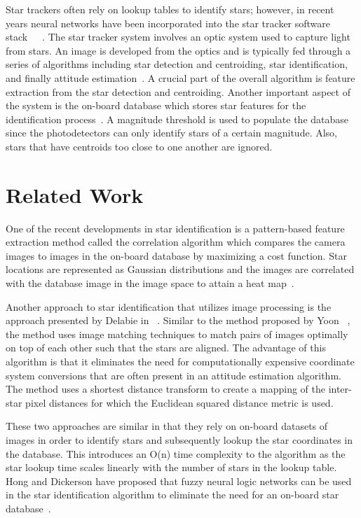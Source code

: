 \documentclass[10pt,twocolumn,letterpaper]{article}
\begin{document}
Star trackers often rely on lookup tables to identify stars; however, in recent years neural networks have been incorporated into the star tracker software stack~\cite{lowcost}~\cite{neural1}~\cite{neural2}. The star tracker system involves an optic system used to capture light from stars. An image is developed from the optics and is typically fed through a series of algorithms including star detection and centroiding, star identification, and finally attitude estimation~\cite{survey}. A crucial part of the overall algorithm is feature extraction from the star detection and centroiding. Another important aspect of the system is the on-board database which stores star features for the identification process~\cite{survey}. A magnitude threshold is used to populate the database since the photodetectors can only identify stars of a certain magnitude. Also, stars that have centroids too close to one another are ignored.


\section{Related Work}
\label{sec:related}

One of the recent developments in star identification is a pattern-based feature extraction method called the correlation algorithm which compares the camera images to images in the on-board database by maximizing a cost function. Star locations are represented as Gaussian distributions and the images are correlated with the database image in the image space to attain a heat map~\cite{corr}.

Another approach to star identification that utilizes image processing is the approach presented by Delabie \etal in ~\cite{optimal}. Similar to the method proposed by Yoon \etal ~\cite{corr}, the method uses image matching techniques to match pairs of images optimally on top of each other such that the stars are aligned. The advantage of this algorithm is that it eliminates the need for computationally expensive coordinate system conversions that are often present in an attitude estimation algorithm. The method uses a shortest distance transform to create a mapping of the inter-star pixel distances for which the Euclidean squared distance metric is used.

These two approaches are similar in that they rely on on-board datasets of images in order to identify stars and subsequently lookup the star coordinates in the database. This introduces an O(n) time complexity to the algorithm as the star lookup time scales linearly with the number of stars in the lookup table. Hong and Dickerson have proposed that fuzzy neural logic networks can be used in the star identification algorithm to eliminate the need for an on-board star database~\cite{neural1}.
\end{document}
